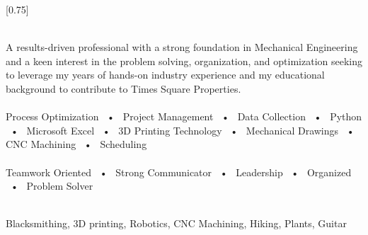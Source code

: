 \documentclass[allblack]{simplehipstercv}
\begin{document}
\setlength{\columnsep}{2cm}
[0.75]
\begin{paracol}{2}


\paracolbackgroundoptions


\footnotesize
{\setasidefontcolour
\flushleft
{}\\[0.5em]
    {\footnotesize
    A results-driven
    professional with a strong
    foundation in Mechanical
    Engineering and a keen interest in
    the problem solving, organization, and optimization
    seeking to leverage my years of
    hands-on industry experience and
    my educational background to
    contribute to Times Square Properties.}\\
\bigskip
{} \\[0.5em]

    Process Optimization ~•~ Project Management ~•~ Data Collection ~•~ Python ~•~ Microsoft Excel ~•~ 3D Printing Technology ~•~ Mechanical Drawings ~•~ CNC Machining ~•~ Scheduling\\

\bigskip
{} \\[0.5em]

    Teamwork Oriented ~•~ Strong Communicator ~•~ Leadership ~•~ Organized ~•~ Problem Solver\\

\bigskip

\\[0.5em]

Blacksmithing, 3D printing, Robotics, CNC Machining,
Hiking, Plants, Guitar\\
\bigskip


}
\switchcolumn


\end{paracol}
\end{document}
